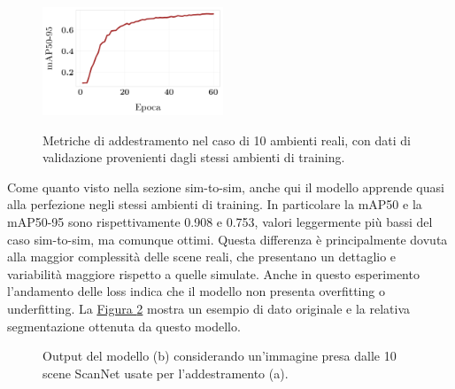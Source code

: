 \documentclass[12pt]{report}
\begin{document}
\begin{figure}[h!]
	\hspace{0.01\textwidth}
	{\includegraphics[width=0.48\textwidth]{images/domain-shift/real-to-real/1/map50-95}}
	\caption{Metriche di addestramento nel caso di 10 ambienti reali, con dati di validazione provenienti dagli stessi ambienti di training.}
	\label{fig:real-to-real-training-1}
\end{figure}

Come quanto visto nella sezione sim-to-sim, anche qui il modello apprende quasi alla perfezione negli stessi ambienti di training. In particolare la mAP50 e la mAP50-95 sono rispettivamente 0.908 e 0.753, valori leggermente più bassi del caso sim-to-sim, ma comunque ottimi. Questa differenza è principalmente dovuta alla maggior complessità delle scene reali, che presentano un dettaglio e variabilità maggiore rispetto a quelle simulate. Anche in questo esperimento l'andamento delle loss indica che il modello non presenta overfitting o underfitting. La \hyperref[fig:real-to-real-prediction-1]{Figura \ref{fig:real-to-real-prediction-1}} mostra un esempio di dato originale e la relativa segmentazione ottenuta da questo modello.

\begin{figure}[h!]
	\centering
	\hspace{0.01\textwidth}
	\hspace{0.01\textwidth}
	\caption{Output del modello (b) considerando un'immagine presa dalle 10 scene ScanNet usate per l'addestramento (a).}
	\label{fig:real-to-real-prediction-1}
\end{figure}
\end{document}
